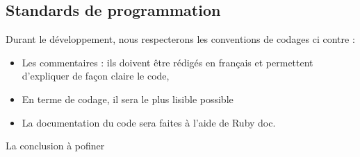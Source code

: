 \documentclass[11pt]{article}
\begin{document}
\subsection{Standards de programmation}

Durant le développement, nous respecterons les conventions de codages ci contre : 

\begin{itemize}
	\item Les commentaires : ils doivent être rédigés en français et permettent d'expliquer de façon claire le code,
	\item En terme de codage, il sera le plus lisible possible
	\item La documentation du code sera faites à l'aide de Ruby doc. 
\end{itemize}


\newpage

La conclusion à pofiner 
\end{document}
